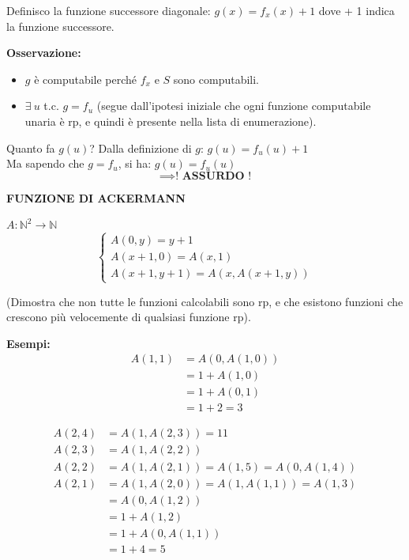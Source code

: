 Definisco la funzione successore diagonale: $g(x) = f_x(x) + 1$ dove + 1 indica la funzione successore. 

\textbf{Osservazione:}
\begin{itemize}
    \item $g$ è computabile perché $f_x$ e $S$ sono computabili.
    \item $\exists\ u$ t.c. $g = f_u$ (segue dall'ipotesi iniziale che ogni funzione computabile unaria è rp, e quindi è presente nella lista di enumerazione).
\end{itemize}

Quanto fa $g(u)$?
Dalla definizione di $g$: $g(u) = f_u(u) + 1$ \\
Ma sapendo che $g = f_u$, si ha: $g(u) = f_u(u)$ \\
$$ \implies \textbf{! ASSURDO !} $$

\vspace{0.6cm}
\textbf{FUNZIONE DI ACKERMANN}

$A: \mathbb{N}^2 \to \mathbb{N}$
$$
\begin{cases}
A(0, y) = y+1 \\
A(x+1, 0) = A(x, 1) \\
A(x+1, y+1) = A(x, A(x+1, y))
\end{cases}
$$
 
(Dimostra che non tutte le funzioni calcolabili sono rp, e che esistono funzioni che crescono più velocemente di qualsiasi funzione rp).

\vspace{0.4cm}
\textbf{Esempi:}
\begin{align*}
A(1,1) &= A(0, A(1,0)) \\
&= 1 + A(1,0) \\
&= 1 + A(0,1) \\
&= 1 + 2 = 3
\end{align*}

\begin{align*}
A(2,4) &= A(1, A(2,3)) = 11 \\
A(2,3) &= A(1, A(2,2)) \\
A(2,2) &= A(1, A(2,1)) = A(1,5) = A(0, A(1,4)) \\
A(2,1) &= A(1, A(2,0)) = A(1, A(1,1)) = A(1,3) \\
&= A(0, A(1,2)) \\
&= 1 + A(1,2) \\
&= 1 + A(0, A(1,1)) \\
&= 1 + 4 = 5
\end{align*}

